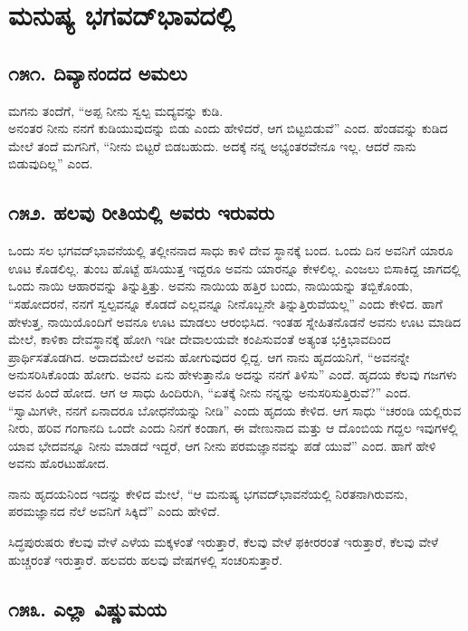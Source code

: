 \chapter{ಮನುಷ್ಯ ಭಗವದ್​ಭಾವದಲ್ಲಿ}

\section{\num{೧೫೧. } ದಿವ್ಯಾನಂದದ ಅಮಲು}

ಮಗನು ತಂದೆಗೆ, “ಅಪ್ಪ ನೀನು ಸ್ವಲ್ಪ ಮದ್ಯವನ್ನು ಕುಡಿ.\\ಅನಂತರ ನೀನು ನನಗೆ ಕುಡಿಯುವುದನ್ನು ಬಿಡು ಎಂದು ಹೇಳಿದರೆ, ಆಗ ಬಿಟ್ಟಬಿಡುವೆ” ಎಂದ. ಹೆಂಡವನ್ನು ಕುಡಿದ ಮೇಲೆ ತಂದೆ ಮಗನಿಗೆ, “ನೀನು ಬಿಟ್ಟರೆ ಬಿಡಬಹುದು. ಅದಕ್ಕೆ ನನ್ನ ಅಭ್ಯಂತರವೇನೂ ಇಲ್ಲ. ಆದರೆ ನಾನು ಬಿಡುವುದಿಲ್ಲ” ಎಂದ.


\section{\num{೧೫೨. } ಹಲವು ರೀತಿಯಲ್ಲಿ ಅವರು ಇರುವರು}

ಒಂದು ಸಲ ಭಗವದ್​ಭಾವನೆಯಲ್ಲಿ ತಲ್ಲೀನನಾದ ಸಾಧು ಕಾಳಿ ದೇವ ಸ್ಥಾನಕ್ಕೆ ಬಂದ. ಒಂದು ದಿನ ಅವನಿಗೆ ಯಾರೂ ಊಟ ಕೊಡಲಿಲ್ಲ. ತುಂಬ ಹೊಟ್ಟೆ ಹಸಿಯುತ್ತ ಇದ್ದರೂ ಅವನು ಯಾರನ್ನೂ ಕೇಳಲಿಲ್ಲ. ಎಂಜಲು ಬಿಸಾಕಿದ್ದ ಜಾಗದಲ್ಲಿ ಒಂದು ನಾಯಿ ಆಹಾರವನ್ನು ತಿನ್ನುತ್ತಿತ್ತು. ಅವನು ನಾಯಿಯ ಹತ್ತಿರ ಬಂದು, ನಾಯಿಯನ್ನು ತಬ್ಬಿಕೊಂಡು, “ಸಹೋದರನೆ, ನನಗೆ ಸ್ವಲ್ಪವನ್ನೂ ಕೊಡದೆ ಎಲ್ಲವನ್ನೂ ನೀನೊಬ್ಬನೇ ತಿನ್ನುತ್ತಿರುವೆಯಲ್ಲ” ಎಂದು ಕೇಳಿದ. ಹಾಗೆ ಹೇಳುತ್ತ, ನಾಯಿಯೊಂದಿಗೆ ಅವನೂ ಊಟ ಮಾಡಲು ಆರಂಭಿಸಿದ. ಇಂತಹ ಸ್ನೇಹಿತನೊಡನೆ ಅವನು ಊಟ ಮಾಡಿದ ಮೇಲೆ, ಕಾಳಿಕಾ ದೇವಸ್ಥಾನಕ್ಕೆ ಹೋಗಿ ಇಡೀ ದೇವಾಲಯವೇ ಕಂಪಿಸುವಂತೆ ಅತ್ಯಂತ ಭಕ್ತಿಭಾವದಿಂದ ಪ್ರಾರ್ಥಿಸತೊಡಗಿದ. ಅದಾದಮೇಲೆ ಅವನು ಹೋಗುವುದರ ಲ್ಲಿದ್ದ. ಆಗ ನಾನು ಹೃದಯನಿಗೆ, “ಅವನನ್ನೇ ಅನುಸರಿಸಿಕೊಂಡು ಹೋಗು. ಅವನು ಏನು ಹೇಳುತ್ತಾನೊ ಅದನ್ನು ನನಗೆ ತಿಳಿಸು” ಎಂದೆ. ಹೃದಯ ಕೆಲವು ಗಜಗಳು ಅವನ ಹಿಂದೆ ಹೋದ. ಆಗ ಆ ಸಾಧು ಹಿಂದಿರುಗಿ, “ಏತಕ್ಕೆ ನೀನು ನನ್ನನ್ನು ಅನುಸರಿಸುತ್ತಿರುವೆ?” ಎಂದ. “ಸ್ವಾಮಿಗಳೇ, ನನಗೆ ಏನಾದರೂ ಬೋಧನೆಯನ್ನು ನೀಡಿ” ಎಂದು ಹೃದಯ ಕೇಳಿದ. ಆಗ ಸಾಧು “ಚರಂಡಿ ಯಲ್ಲಿರುವ ನೀರು, ಹರಿವ ಗಂಗಾನದಿ ಒಂದೇ ಎಂದು ನಿನಗೆ ಕಂಡಾಗ, ಈ ವೇಣುನಾದ ಮತ್ತು ಆ ದೊಂಬಿಯ ಗದ್ದಲ ಇವುಗಳಲ್ಲಿ ಯಾವ ಭೇದವನ್ನೂ ನೀನು ಮಾಡದೆ ಇದ್ದರೆ, ಆಗ ನೀನು ಪರಮಜ್ಞಾನವನ್ನು ಪಡೆ ಯುವೆ” ಎಂದ. ಹಾಗೆ ಹೇಳಿ ಅವನು ಹೊರಟುಹೋದ.

ನಾನು ಹೃದಯನಿಂದ ಇದನ್ನು ಕೇಳಿದ ಮೇಲೆ, “ಆ ಮನುಷ್ಯ ಭಗವದ್​ಭಾವನೆಯಲ್ಲಿ ನಿರತನಾಗಿರುವನು, ಪರಮಜ್ಞಾನದ ನೆಲೆ ಅವನಿಗೆ ಸಿಕ್ಕಿದೆ” ಎಂದು ಹೇಳಿದೆ.

ಸಿದ್ಧಪುರುಷರು ಕೆಲವು ವೇಳೆ ಎಳೆಯ ಮಕ್ಕಳಂತೆ ಇರುತ್ತಾರೆ, ಕೆಲವು ವೇಳೆ ಫಕೀರರಂತೆ ಇರುತ್ತಾರೆ, ಕೆಲವು ವೇಳೆ ಹುಚ್ಚರಂತೆ ಇರುತ್ತಾರೆ. ಹಲವರು ಹಲವು ವೇಷಗಳಲ್ಲಿ ಸಂಚರಿಸುತ್ತಾರೆ.


\section{\num{೧೫೩. } ಎಲ್ಲಾ ವಿಷ್ಣುಮಯ}

